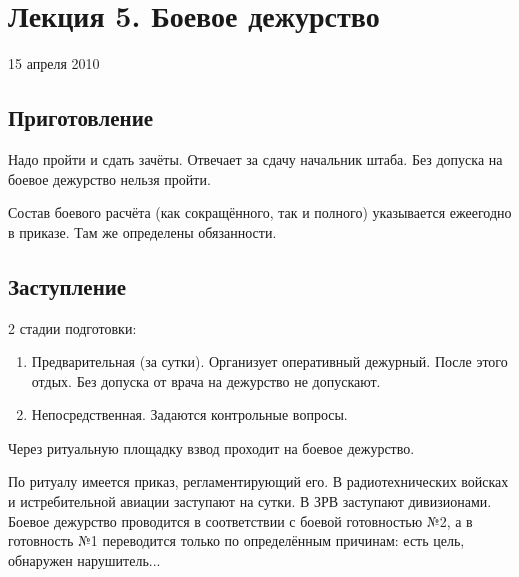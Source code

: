 \documentclass[a4paper,12pt]{article}
\begin{document}
	\section{\bf Лекция 5. Боевое дежурство}
	\centerline{15 апреля 2010}
	\subsection{\bf Приготовление}
	Надо пройти и сдать зачёты. Отвечает за сдачу начальник штаба. Без допуска на боевое 
дежурство нельзя пройти.

	Состав боевого расчёта (как сокращённого, так и полного) указывается ежеегодно в приказе. 
Там же определены обязанности.
	\subsection{\bf Заступление}
	2 стадии подготовки:
	\begin{enumerate}
		\item Предварительная (за сутки). Организует оперативный дежурный. После этого отдых.
		Без допуска от врача на дежурство не допускают.
		\item Непосредственная. Задаются контрольные вопросы.
	\end{enumerate}
	Через ритуальную площадку взвод проходит на боевое дежурство.
	
	По ритуалу имеется приказ, регламентирующий его. В радиотехнических войсках и истребительной
авиации заступают на сутки. В ЗРВ заступают дивизионами. Боевое дежурство проводится в
соответствии с боевой готовностью №2, а в готовность №1 переводится только по определённым
причинам: есть цель, обнаружен нарушитель...
\end{document}
